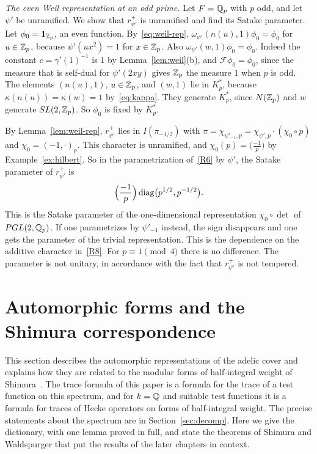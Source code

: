 \begin{example}\label{ex:unramified-weil}
\emph{The even Weil representation at an odd prime.} Let $F=\mathbb{Q}_p$ with
$p$ odd, and let $\psi'$ be unramified. We show that $r^+_{\psi'}$ is
unramified and find its Satake parameter. Let $\phi_0=\mathbf 1_{\mathbb{Z}_p}$,
an even function. By~\eqref{eq:weil-rep},
$\omega_{\psi'}(n(u),1)\phi_0=\phi_0$ for $u\in\mathbb{Z}_p$, because
$\psi'(ux^2)=1$ for $x\in\mathbb{Z}_p$. Also $\omega_{\psi'}(w,1)\phi_0=\phi_0$.
Indeed the constant $c=\gamma'(1)^{-1}$ is $1$ by
Lemma~\ref{lem:weil}(b), and $\mathcal F\phi_0=\phi_0$, since the
measure that is self-dual for $\psi'(2xy)$ gives $\mathbb{Z}_p$ the measure $1$
when $p$ is odd. The elements $(n(u),1)$, $u\in\mathbb{Z}_p$, and $(w,1)$ lie in
$K_p^*$, because $\kappa(n(u))=\kappa(w)=1$ by~\eqref{eq:kappa}. They
generate $K_p^*$, since $N(\mathbb{Z}_p)$ and $w$ generate $SL(2,\mathbb{Z}_p)$. So
$\phi_0$ is fixed by $K_p^*$.

By Lemma~\ref{lem:weil-rep}, $r^+_{\psi'}$ lies in $I(\pi_{-1/2})$ with
$\pi=\chi_{\psi'_{-1},p}=\chi_{\psi',p}\cdot(\chi_0\circ p)$ and
$\chi_0=(-1,\cdot)_p$. This character is unramified, and
$\chi_0(p)=\bigl(\frac{-1}p\bigr)$ by Example~\ref{ex:hilbert}. So in the
parametrization of~\ref{R6} by $\psi'$, the Satake parameter of
$r^+_{\psi'}$ is
\[
\Bigl(\frac{-1}p\Bigr)\operatorname{diag}\bigl(p^{1/2},p^{-1/2}\bigr).
\]
This is the Satake parameter of the one-dimensional representation
$\chi_0\circ\det$ of $PGL(2,\mathbb{Q}_p)$. If one parametrizes by $\psi'_{-1}$
instead, the sign disappears and one gets the parameter of the trivial
representation. This is the dependence on the additive character
in~\ref{R8}. For $p\equiv1\pmod4$ there is no difference. The parameter
is not unitary, in accordance with the fact that $r^+_{\psi'}$ is not
tempered.
\end{example}

\section{Automorphic forms and the Shimura correspondence}
\label{sec:rep-global}

This section describes the automorphic representations of the adelic
cover and explains how they are related to the modular forms of
half-integral weight of Shimura~\cite{Sh73}. The trace formula of this
paper is a formula for the trace of a test function on this spectrum, and
for $k=\mathbb{Q}$ and suitable test functions it is a formula for traces of
Hecke operators on forms of half-integral weight. The precise
statements about the spectrum are in Section~\ref{sec:decomp}. Here we
give the dictionary, with one lemma proved in full, and state the
theorems of Shimura and Waldspurger that put the results of the later
chapters in context.

